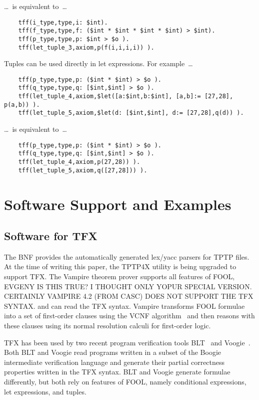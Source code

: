 \documentclass{easychair}
\begin{document}
\ldots~is equivalent to~\ldots
\begin{verbatim}
    tff(i_type,type,i: $int).
    tff(f_type,type,f: ($int * $int * $int * $int) > $int).
    tff(p_type,type,p: $int > $o ).
    tff(let_tuple_3,axiom,p(f(i,i,i,i)) ).
\end{verbatim}
Tuples can be used directly in let expressions. 
For example~\ldots
\begin{verbatim}
    tff(p_type,type,p: ($int * $int) > $o ).
    tff(q_type,type,q: [$int,$int] > $o ).
    tff(let_tuple_4,axiom,$let([a:$int,b:$int], [a,b]:= [27,28], p(a,b)) ).
    tff(let_tuple_5,axiom,$let(d: [$int,$int], d:= [27,28],q(d)) ).
\end{verbatim}
\ldots~is equivalent to~\ldots
\begin{verbatim}
    tff(p_type,type,p: ($int * $int) > $o ).
    tff(q_type,type,q: [$int,$int] > $o ).
    tff(let_tuple_4,axiom,p(27,28)) ).
    tff(let_tuple_5,axiom,q([27,28])) ).
\end{verbatim}
\section{Software Support and Examples}
\label{ImplementationExamples}

\subsection{Software for TFX}
\label{Software}

The BNF provides the automatically generated lex/yacc parsers for TPTP files.
At the time of writing this paper, the TPTP4X utility is being upgraded
to support TFX.
The Vampire theorem prover \cite{KV13} supports all features of FOOL,
EVGENY IS THIS TRUE? I THOUGHT ONLY YOPUR SPECIAL VERSION. CERTAINLY VAMPIRE
4.2 (FROM CASC) DOES NOT SUPPORT THE TFX SYNTAX.
and can
read the TFX syntax. 
Vampire transforms FOOL formulae into a set of first-order clauses using the 
VCNF algorithm~\cite{KK+16-GCAI} and then reasons with these clauses using 
its normal resolution calculi for first-order logic.

TFX has been used by two recent program verification tools BLT~\cite{CF17} and
Voogie~\cite{KKV18}. 
Both BLT and Voogie read programs written in a subset of the Boogie 
intermediate verification language and generate their partial correctness 
properties written in the TFX syntax. 
BLT and Voogie generate formulae differently, but both rely on features of 
FOOL, namely conditional expressions, let expressions, and tuples.
\end{document}
